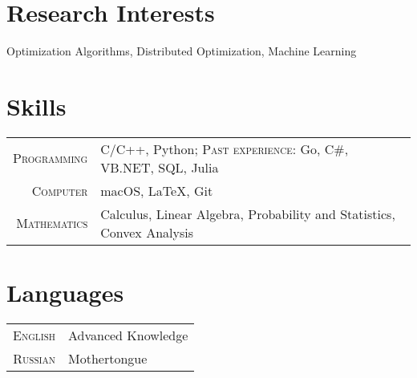 \documentclass[a4paper,10pt]{article} %
\begin{document}
\section{Research Interests}
Optimization Algorithms, Distributed Optimization, Machine Learning




\section{Skills}

\begin{tabular}{rl}
	\textsc{Programming} & C/C++, Python; \textsc{Past experience:} Go, C\#, VB.NET, SQL, Julia\\
	\textsc{Computer} & macOS, LaTeX, Git\\
	\textsc{Mathematics} & Calculus, Linear Algebra, Probability and Statistics, Convex Analysis\\
\end{tabular}

\section{Languages}

\begin{tabular}{rl}
\textsc{English} & Advanced Knowledge \\
\textsc{Russian} & Mothertongue\\
\end{tabular}
\end{document}
